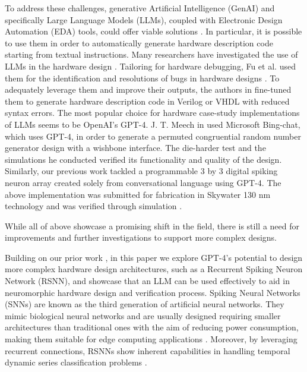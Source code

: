 To address these challenges, generative Artificial Intelligence (GenAI) and specifically Large Language Models (LLMs), coupled with Electronic Design Automation (EDA) tools, could offer viable solutions \cite{2021_eda_ML_survey}. 
In particular, it is possible to use them in order to automatically generate hardware description code starting from textual instructions.
Many researchers have investigated the use of LLMs in the hardware design \cite{2023_chipChat, 2023_VerilogEval_LLM}. 
Tailoring for hardware debugging, Fu et al. used them for the identification and resolutions of bugs in hardware designs \cite{2023_LLM4SecHW_LLM_for_HW_design_and_verification, 2024_LLM_for_Verilog}.
To adequately leverage them and improve their outputs, the authors in  \cite{2024_Hardware_Phi_LLM_for_HW_design_and_verification, 2024_soft_hard_codesign_LLM,2023_Benchmarking_LLM_for_RTL} fine-tuned them to generate hardware description code in Verilog or VHDL with reduced syntax errors.
The most popular choice for hardware case-study implementations of LLMs seems to be OpenAI's GPT-4.
J. T. Meech in \cite{2023_RNG_LLM} used Microsoft Bing-chat, which uses GPT-4, in order to generate a permuted congruential random number generator design with a wishbone interface.
The die-harder test and the simulations he conducted verified its functionality and quality of the design.
Similarly, our previous work tackled a programmable 3 by 3 digital spiking neuron array created solely from conversational language using GPT-4. The above implementation was submitted for fabrication in Skywater 130 nm technology and was verified through simulation \cite{2024_Mike_chatgptSNN}. 

While all of above showcase a promising shift in the field, there is still a need for improvements and further investigations to support more complex designs. 

Building on our prior work \cite{2024_Mike_chatgptSNN}, in this paper we explore GPT-4’s potential to design more complex hardware design architectures, such as a Recurrent Spiking Neuron Network (RSNN), and showcase that an LLM can be used effectively to aid in neuromorphic hardware design and verification process.
Spiking Neural Networks (SNNs) are known as the third generation of artificial neural networks. They mimic biological neural networks and are usually designed requiring smaller architectures than traditional ones with the aim of reducing power consumption, making them suitable for edge computing applications \cite{edgesnn,cassidy_design_2013}.
Moreover, by leveraging recurrent connections, RSNNs show inherent capabilities in handling temporal dynamic series classification problems \cite{Spatiotemporal,craley_action_2017}.

